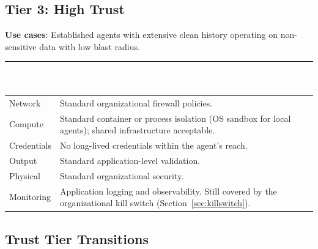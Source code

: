 \documentclass[11pt,letterpaper]{article}
\newcommand{\hrow}{\rowcolor{slategraphite}}
\newcommand{\hdr}[1]{\textcolor{white}{\bfseries\strut #1}}
\begin{document}
\subsection{Tier 3: High Trust}
\label{sec:tier3}

\textbf{Use cases}: Established agents with extensive clean history operating on non-sensitive data with low blast radius.

\begin{longtable}{L{3cm} L{13cm}}
\hrow \hdr{Control} & \hdr{Implementation} \\
\endhead
Network & Standard organizational firewall policies. \\
Compute & Standard container or process isolation (OS sandbox for local agents); shared infrastructure acceptable. \\
Credentials & No long-lived credentials within the agent's reach. \\
Output & Standard application-level validation. \\
Physical & Standard organizational security. \\
Monitoring & Application logging and observability. Still covered by the organizational kill switch (Section~\ref{sec:killswitch}). \\*
\bottomrule
\end{longtable}

\subsection{Trust Tier Transitions}
\label{sec:transitions}
\end{document}
